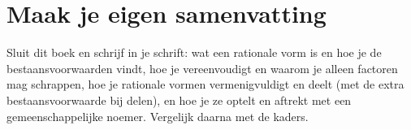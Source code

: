 \begin{oefeningen}














\end{oefeningen}


\begin{oefeningen}






\end{oefeningen}


\ifzelfstudie
\section*{Maak je eigen samenvatting}
Sluit dit boek en schrijf in je schrift: wat een rationale vorm is en hoe je de bestaansvoorwaarden vindt, hoe je vereenvoudigt en waarom je alleen factoren mag schrappen, hoe je rationale vormen vermenigvuldigt en deelt (met de extra bestaansvoorwaarde bij delen), en hoe je ze optelt en aftrekt met een gemeenschappelijke noemer. Vergelijk daarna met de kaders.
\fi
